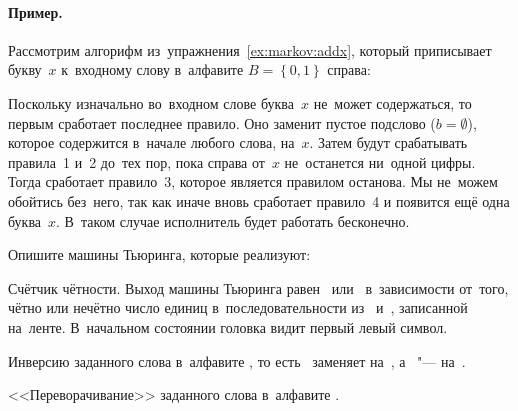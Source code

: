 \paragraph{Пример.}
Рассмотрим алгорифм из~упражнения~\ref{ex:markov:addx}, который приписывает букву~\(x\) к~входному слову в~алфавите \(B = \left\{0, 1\right\}\) справа:

Поскольку изначально во~входном слове буква~\(x\) не~может содержаться, то первым сработает последнее правило. Оно заменит пустое подслово (\(b = \emptyset\)), которое содержится в~начале любого слова, на~\(x\). Затем будут срабатывать правила~1 и~2 до~тех пор, пока справа от~\(x\) не~останется ни~одной цифры. Тогда сработает правило~3, которое является правилом останова. Мы не~можем обойтись без~него, так как иначе вновь сработает правило~4 и появится ещё одна буква~\(x\). В~таком случае исполнитель будет работать бесконечно.



\WhatToReadSection
\citeauthor[лекции~1--3 и семинары~1--3, стр.~24--60]{Vorozhcov:2008:ru}



\ExercisesSection
Опишите машины Тьюринга, которые реализуют:
\begin{exercise}[series=statemachine]
\item\label{ex:turing:parity} Счётчик чётности. Выход машины Тьюринга равен~ или~ в~зависимости от~того, чётно или нечётно число единиц в~последовательности из~ и~, записанной на~ленте. В~начальном состоянии головка видит первый левый символ.

\item\label{ex:turing:invert} Инверсию заданного слова в~алфавите , то есть~ заменяет на~, а~ "--- на~.

\item\label{ex:turing:reverse} <<Переворачивание>> заданного слова в~алфавите .
\end{exercise}



